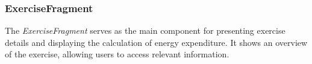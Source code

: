 \subsubsection{ExerciseFragment}
The \emph{ExerciseFragment} serves as the main component for presenting exercise details and displaying the calculation of energy expenditure. 
It shows an overview of the exercise, allowing users to access relevant information.





